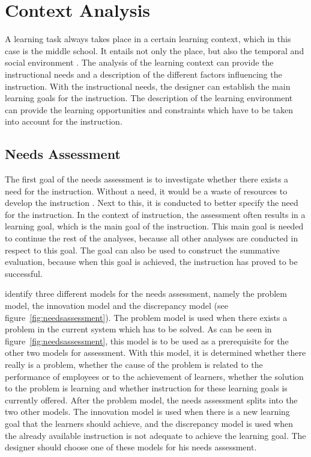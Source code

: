 \documentclass[11pt,twoside]{report} %
\begin{document}

\chapter{Context Analysis}

A learning task always takes place in a certain learning context, which in this case is the middle school. It entails not only the place, but also the temporal and social environment \cite{smithragan}. The analysis of the learning context can provide the instructional needs and a description of the different factors influencing the instruction. With the instructional needs, the designer can establish the main learning goals for the instruction. The description of the learning environment can provide the learning opportunities and constraints which have to be taken into account for the instruction.


\section{Needs Assessment}

The first goal of the needs assessment is to investigate whether there exists a need for the instruction.  Without a need, it would be a waste of resources to develop the instruction \cite{smithragan}. Next to this, it is conducted to better specify the need for the instruction. In the context of instruction, the assessment often results in a learning goal, which is the main goal of the instruction. This main goal is needed to continue the rest of the analyses, because all other analyses are conducted in respect to this goal. The goal can also be used to construct the summative evaluation, because when this goal is achieved, the instruction has proved to be successful.

 identify three different models for the needs assessment, namely the problem model, the innovation model and the discrepancy model (see figure~\ref{fig:needsassessment}). The problem model is used when there exists a problem in the current system which has to be solved. As can be seen in figure~\ref{fig:needsassessment}, this model is to be used as a prerequisite for the other two models for assessment. With this model, it is determined whether there really is a problem, whether the cause of the problem is related to the performance of employees or to the achievement of learners, whether the solution to the problem is learning and whether instruction for these learning goals is currently offered. After the problem model, the needs assessment splits into the two other models. The innovation model is used when there is a new learning goal that the learners should achieve, and the discrepancy model is used when the already available instruction is not adequate to achieve the learning goal. The designer should choose one of these models for his needs assessment.
\end{document}
